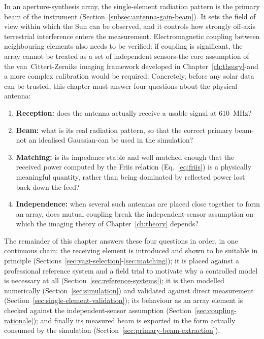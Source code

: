 In an aperture-synthesis array, the single-element radiation pattern is the
primary beam of the instrument (Section~\ref{subsec:antenna-gain-beam}). It
sets the field of view within which the Sun can be observed, and it controls
how strongly off-axis terrestrial interference enters the measurement.
Electromagnetic coupling between neighbouring elements also needs to be
verified: if coupling is significant, the array cannot be treated as a set
of independent sensors-the core assumption of the van~Cittert-Zernike
imaging framework developed in Chapter~\ref{ch:theory}-and a more complex
calibration would be required. Concretely, before any solar data can be
trusted, this chapter must answer four questions about the physical antenna:
\begin{enumerate}[leftmargin=1.8em]
  \item \textbf{Reception:} does the antenna actually receive a usable
        signal at \SI{610}{\mega\hertz}?
  \item \textbf{Beam:} what is its real radiation pattern, so that the
        correct primary beam-not an idealised Gaussian-can be used in the
        simulation?
  \item \textbf{Matching:} is its impedance stable and well matched enough
        that the received power computed by the Friis relation
        (Eq.~\eqref{eq:friis}) is a physically meaningful quantity, rather
        than being dominated by reflected power lost back down the feed?
  \item \textbf{Independence:} when several such antennas are placed close
        together to form an array, does mutual coupling break the
        independent-sensor assumption on which the imaging theory of
        Chapter~\ref{ch:theory} depends?
\end{enumerate}
The remainder of this chapter answers these four questions in order, in one
continuous chain: the receiving element is introduced and shown to be
suitable in principle (Sections~\ref{sec:yagi-selection}-\ref{sec:matching});
it is placed against a professional reference system and a field trial to
motivate why a controlled model is necessary at all
(Section~\ref{sec:reference-systems}); it is then modelled numerically
(Section~\ref{sec:simulation}) and validated against direct measurement
(Section~\ref{sec:single-element-validation}); its behaviour as an array
element is checked against the independent-sensor assumption
(Section~\ref{sec:coupling-rationale}); and finally its measured beam is
exported in the form actually consumed by the simulation
(Section~\ref{sec:primary-beam-extraction}).

